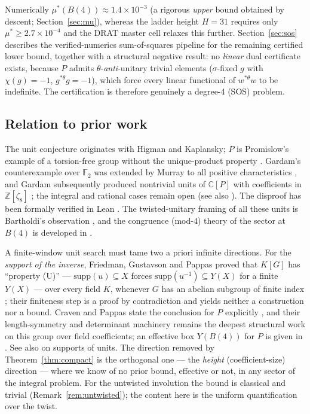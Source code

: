 \documentclass[11pt]{article}
\newcommand{\ZZ}{\mathbb{Z}}
\newcommand{\thst}{{*\theta}}
\newcommand{\supp}{\mathrm{supp}}
\begin{document}
Numerically $\mu^*(B(4))\approx 1.4\times 10^{-3}$ (a rigorous
\emph{upper} bound obtained by descent; Section~\ref{sec:mu}), whereas
the ladder height $H=31$ requires only $\mu^*\ge 2.7\times10^{-4}$ and
the DRAT master cell relaxes this further.  Section~\ref{sec:sos}
describes the verified-numerics sum-of-squares pipeline for the
remaining certified lower bound, together with a structural negative
result: no \emph{linear} dual certificate exists, because $P$ admits
$\theta$-\emph{anti}-unitary trivial elements ($\sigma$-fixed $g$ with
$\chi(g)=-1$, $g^{\thst}g=-1$), which force every linear functional of
$w^{\thst}w$ to be indefinite.  The certification is therefore
genuinely a degree-4 (SOS) problem.

\subsection*{Relation to prior work}

The unit conjecture originates with Higman \cite{Higman1940} and
Kaplansky; $P$ is Promislow's example of a torsion-free group without
the unique-product property \cite{Promislow1988}.  Gardam's
counterexample over $\mathbb{F}_2$ \cite{Gardam} was extended by
Murray to all positive characteristics \cite{Murray2021}, and Gardam
subsequently produced nontrivial units of $\mathbb{C}[P]$ with
coefficients in $\ZZ[\zeta_8]$ \cite{GardamComplex2023}; the integral
and rational cases remain open (see also \cite{Passman2021}).  The
disproof has been formally verified in Lean
\cite{GadgilTadipatri2024}.  The twisted-unitary framing of all these
units is Bartholdi's observation \cite{Bartholdi2022}, and the
congruence (mod-$4$) theory of the sector at $B(4)$ is developed in
\cite{paper5}.

A finite-window unit search must tame two a priori infinite
directions.  For the \emph{support of the inverse}, Friedman,
Gustavson and Pappas proved that $K[G]$ has ``property (U)'' ---
$\supp(u)\subseteq X$ forces $\supp(u^{-1})\subseteq Y(X)$ for a
finite $Y(X)$ --- over every field $K$, whenever $G$ has an abelian
subgroup of finite index \cite[Thm.~2.3]{FGP1995}; their finiteness
step is a proof by contradiction and yields neither a construction nor
a bound.  Craven and Pappas state the conclusion for $P$ explicitly
\cite[Thm.~14.3]{CravenPappas2013}, and their length-symmetry and
determinant machinery remains the deepest structural work on this
group over field coefficients; an effective box $Y(B(4))$ for $P$ is
given in \cite{paper6}.  See also \cite{Pappas1988} on supports of
units.  The direction removed by Theorem~\ref{thm:compact} is the
orthogonal one --- the \emph{height} (coefficient-size) direction ---
where we know of no prior bound, effective or not, in any sector of
the integral problem.  For the untwisted involution the bound is
classical and trivial (Remark~\ref{rem:untwisted}); the content here
is the uniform quantification over the twist.
\end{document}
